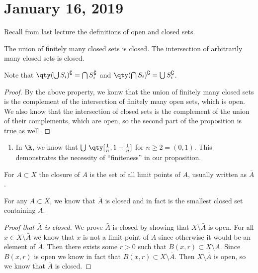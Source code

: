 
\section{January 16, 2019}

Recall from last lecture the definitions of open and closed sets.

\begin{proposition}
The union of finitely many closed sets is closed. The intersection of arbitrarily many closed sets is closed.
\end{proposition}

Note that $\qty(\bigcup S_i)^\complement = \bigcap S_i^\complement$ and $\qty(\bigcap S_i)^\complement = \bigcup S_i^\complement$.

\begin{proof}
By the above property, we konw that the union of finitely many closed sets is the complement of the intersection of finitely many open sets, which is open. We also know that the intersection of closed sets is the complement of the union of their complements, which are open, so the second part of the proposition is true as well.
\end{proof}

\begin{example}
\begin{enumerate}
\item In $\R$, we know that $\bigcup\, \qty[\frac{1}{n}, 1-\frac{1}{n}]$ for $n \geq 2 = (0,1)$. This demonstrates the necessity of ``finiteness'' in our proposition.
\end{enumerate}
\end{example}

\begin{definition}[Closure]
For $A \subset X$ the closure of $A$ is the set of all limit points of $A$, usually written as $\bar{A}$.
\end{definition}

\begin{proposition}
For any $A \subset X$, we know that $\bar{A}$ is closed and in fact is the smallest closed set containing $A$.
\end{proposition}

\begin{proof}[Proof that $\bar{A}$ is closed]
We prove $\bar{A}$ is closed by showing that $X \setminus \bar{A}$ is open. For all $x \in X \setminus \bar{A}$ we know that $x$ is not a limit point of $A$ since otherwise it would be an element of $\bar{A}$. Then there exists some $r > 0$ such that $B(x,r) \subset X \setminus A$. Since $B(x,r)$ is open we know in fact that $B(x,r) \subset X \setminus \bar{A}$. Then $X \setminus \bar{A}$ is open, so we know that $\bar{A}$ is closed.
\end{proof}

